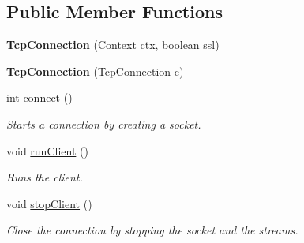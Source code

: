 \subsection*{Public Member Functions}
\begin{DoxyCompactItemize}
\item 
\hypertarget{classcom_1_1client_1_1mobii_1_1connection_1_1_tcp_connection_ac5ed9c533f795045038564be5f31d6cb}{{\bfseries Tcp\-Connection} (Context ctx, boolean ssl)}\label{classcom_1_1client_1_1mobii_1_1connection_1_1_tcp_connection_ac5ed9c533f795045038564be5f31d6cb}

\item 
\hypertarget{classcom_1_1client_1_1mobii_1_1connection_1_1_tcp_connection_a531b1273d81689406cb270de0948c5df}{{\bfseries Tcp\-Connection} (\hyperlink{classcom_1_1client_1_1mobii_1_1connection_1_1_tcp_connection}{Tcp\-Connection} c)}\label{classcom_1_1client_1_1mobii_1_1connection_1_1_tcp_connection_a531b1273d81689406cb270de0948c5df}

\item 
\hypertarget{classcom_1_1client_1_1mobii_1_1connection_1_1_tcp_connection_a495bf5adb3431e3370a005809164a5eb}{int \hyperlink{classcom_1_1client_1_1mobii_1_1connection_1_1_tcp_connection_a495bf5adb3431e3370a005809164a5eb}{connect} ()}\label{classcom_1_1client_1_1mobii_1_1connection_1_1_tcp_connection_a495bf5adb3431e3370a005809164a5eb}

\begin{DoxyCompactList}\small\item\em Starts a connection by creating a socket. \end{DoxyCompactList}\item 
void \hyperlink{classcom_1_1client_1_1mobii_1_1connection_1_1_tcp_connection_a416660e3ebed6c2d95ea8d0d360647d2}{run\-Client} ()
\begin{DoxyCompactList}\small\item\em Runs the client. \end{DoxyCompactList}\item 
\hypertarget{classcom_1_1client_1_1mobii_1_1connection_1_1_tcp_connection_a50dc16b4cef4e4c4c1795b5b77656514}{void \hyperlink{classcom_1_1client_1_1mobii_1_1connection_1_1_tcp_connection_a50dc16b4cef4e4c4c1795b5b77656514}{stop\-Client} ()}\label{classcom_1_1client_1_1mobii_1_1connection_1_1_tcp_connection_a50dc16b4cef4e4c4c1795b5b77656514}

\begin{DoxyCompactList}\small\item\em Close the connection by stopping the socket and the streams. \end{DoxyCompactList}\end{DoxyCompactItemize}
